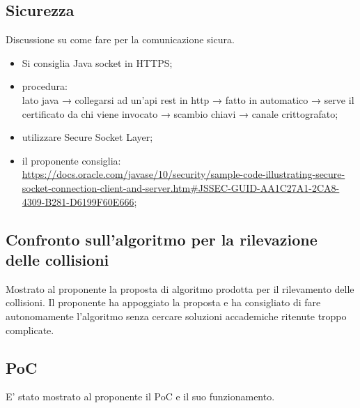 \subsection{Sicurezza}
Discussione su come fare per la comunicazione sicura.
\begin{itemize}
	\item Si consiglia Java socket in HTTPS;
	\item procedura:\\
	lato java → collegarsi ad un'api rest in http → fatto in automatico → serve il certificato da chi viene invocato → scambio chiavi → canale crittografato;
	\item utilizzare Secure Socket Layer;
	\item il proponente consiglia:\\\href{https://docs.oracle.com/javase/10/security/sample-code-illustrating-secure-socket-connection-client-and-server.htm\#JSSEC-GUID-AA1C27A1-2CA8-4309-B281-D6199F60E666}{https://docs.oracle.com/javase/10/security/sample-code-illustrating-secure-socket-connection-client-and-server.htm\#JSSEC-GUID-AA1C27A1-2CA8-4309-B281-D6199F60E666};	
\end{itemize}

\subsection{Confronto sull'algoritmo per la rilevazione delle collisioni}
Mostrato al proponente la proposta di algoritmo prodotta per il rilevamento delle collisioni. Il proponente ha appoggiato la proposta e ha consigliato di fare autonomamente l'algoritmo senza cercare soluzioni accademiche ritenute troppo complicate.

\subsection{PoC}
E' stato mostrato al proponente il PoC e il suo funzionamento. 